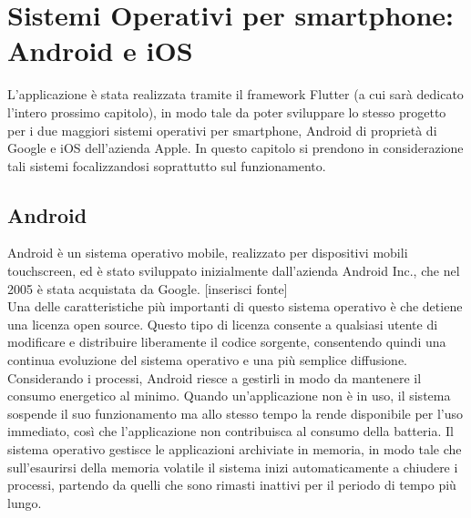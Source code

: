 \chapter{Sistemi Operativi per smartphone: \\ Android e iOS}
L'applicazione è stata realizzata tramite il framework Flutter (a cui sarà
dedicato l'intero prossimo capitolo), in modo tale da poter sviluppare lo stesso
progetto per i due maggiori sistemi operativi per smartphone, Android di
proprietà di Google e iOS dell'azienda Apple. In questo capitolo si prendono in
considerazione tali sistemi focalizzandosi soprattutto sul funzionamento.

\section{Android}
Android è un sistema operativo mobile, realizzato per dispositivi mobili
touchscreen, ed è stato sviluppato inizialmente dall'azienda Android Inc., che
nel 2005 è stata acquistata da Google. [inserisci fonte] \\
Una delle caratteristiche più importanti di questo sistema operativo è che
detiene una licenza open source. Questo tipo di licenza consente a
qualsiasi utente di modificare e distribuire liberamente il codice
sorgente, consentendo quindi una continua evoluzione del sistema operativo e una
più semplice diffusione. Considerando i processi, Android riesce a gestirli in
modo da mantenere il consumo energetico al minimo. Quando un’applicazione non è
in uso, il sistema sospende il suo funzionamento ma allo stesso tempo la rende
disponibile per l’uso immediato, così che l’applicazione non contribuisca
al consumo della batteria. Il sistema operativo gestisce le applicazioni archiviate in
memoria, in modo tale che sull'esaurirsi della memoria volatile il sistema inizi
automaticamente a chiudere i processi, partendo da quelli che sono rimasti
inattivi per il periodo di tempo più lungo.

